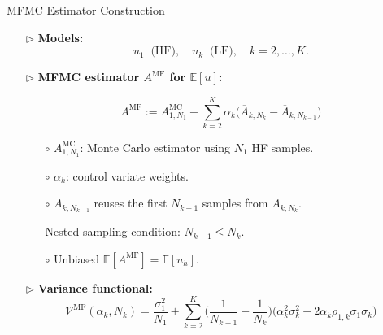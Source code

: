 \documentclass{beamer}
\begin{document}
\begin{frame}{MFMC Estimator Construction}
\begin{itemize}[leftmargin=5pt] 

    \item[$\triangleright$] \textcolor{myblue3}{\bf Models:} 
    \[
    u_1 \;\; \text{(HF)}, \quad u_k\;\; \text{(LF)},\quad  k=2,\dots,K.
    \]
    \item[$\triangleright$]\textcolor{myblue3}{\bf MFMC estimator $A^{\text{MF}}$ for $\mathbb{E}[u]$:} 
    
\[
\boxed{
A^{\text{MF}} := A^{\text{MC}}_{1,N_1} + \sum_{k=2}^K \alpha_k\big(\overline{A}_{k,N_k} - \overline{A}_{k,N_{k-1}}\big)
}
\]
\begin{itemize}[leftmargin=15pt] 
  \item[$\circ$] $A^{\text{MC}}_{1,N_1}$: Monte Carlo estimator using $N_1$ HF samples.
  \item[$\circ$] $\alpha_k$: control variate weights.
  \item[$\circ$] $\overline{A}_{k,N_{k-1}}$ reuses the first $N_{k-1}$ samples from $\overline{A}_{k,N_{k}}$. 
  
  Nested sampling condition: $N_{k-1}\le N_k$.
  \item[$\circ$] Unbiased $\mathbb{E}[A^{\text{MF}}] = \mathbb{E}[u_h]$.
\end{itemize}
\item[$\triangleright$] \textcolor{myblue3}{\bf Variance functional:} 
\[
\boxed{
\mathcal{V}^{\text{MF}}(\alpha_k, N_k)
    =\frac{\sigma_1^2}{N_1} 
    + \sum_{k=2}^K \!\Big(\frac{1}{N_{k-1}} - \frac{1}{N_k}\Big)\!
      \big(\alpha_k^2\sigma_k^2 - 2\alpha_k\rho_{1,k}\sigma_1\sigma_k\big)
}
\]
\end{itemize}
\end{frame}
\end{document}
